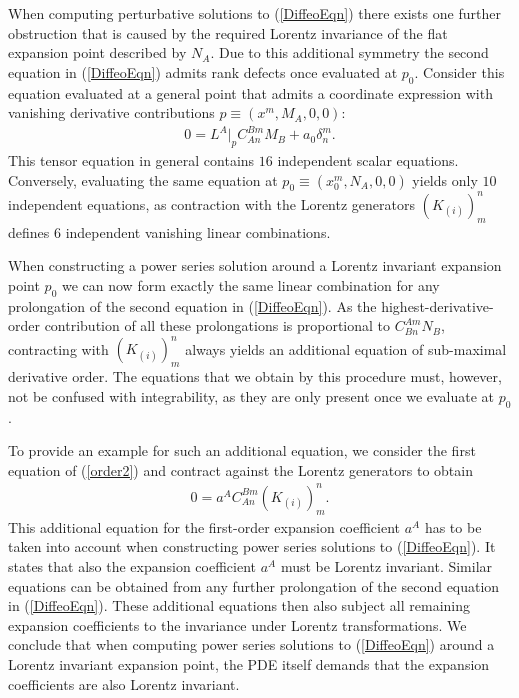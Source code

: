 \documentclass[%
preprint,
titlepage,
nofootinbib,
amsmath,amssymb,
showkeys,
aps,
prd,
floatfix,
]{revtex4-2}
\begin{document}
When computing perturbative solutions to (\ref{DiffeoEqn})  there exists one further obstruction that is caused by the required Lorentz invariance of the flat expansion point described by $N_A$. Due to this additional symmetry the second equation in (\ref{DiffeoEqn}) admits rank defects once evaluated at $p_0$. Consider this equation evaluated at a general point that admits a coordinate expression with vanishing derivative contributions $p \equiv (x^m,M_A,0,0)$:
\begin{align}
0 = L^A \big \vert_{p} C_{An}^{Bm}M_B + a_0 \delta^m_n.
\end{align}
This tensor equation in general contains $16$ independent scalar equations. Conversely, evaluating the same equation at $p_0\equiv (x_0^m, N_A,0,0)$ yields only $10$ independent equations, as contraction with the Lorentz generators $(K_{(i)})^n_m$ defines $6$ independent vanishing linear combinations.

When constructing a power series solution around a Lorentz invariant expansion point $p_0$ we can now form exactly the same linear combination for any prolongation of the second equation in (\ref{DiffeoEqn}). As the highest-derivative-order contribution of all these prolongations is proportional to $C^{Am}_{Bn}N_B$, contracting with $(K_{(i)})^n_m$ always yields an additional equation of sub-maximal derivative order. The equations that we obtain by this procedure must, however, not be confused with integrability, as they are only present once we evaluate at $p_0$. 

To provide an example for such an additional equation, we consider the first equation of (\ref{order2}) and contract against the Lorentz generators to obtain
\begin{align}\label{ansatz1}
    0 = a^A C^{Bm}_{An}  (K_{(i)})^n_m.
\end{align}
This additional equation for the first-order expansion coefficient $a^A$ has to be taken into account when constructing power series solutions to (\ref{DiffeoEqn}).
It states that also the expansion coefficient $a^A$ must be Lorentz invariant. 
Similar equations can be obtained from any further prolongation of the second equation in (\ref{DiffeoEqn}). These additional equations then also subject all remaining expansion coefficients to the invariance under Lorentz transformations.
We conclude that when computing power series solutions to (\ref{DiffeoEqn}) around a Lorentz invariant expansion point, the PDE itself demands that the expansion coefficients are also Lorentz invariant.
\end{document}
